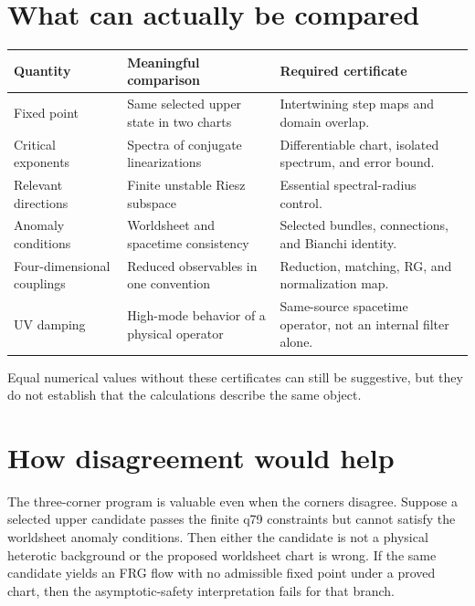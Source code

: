 \documentclass[11pt]{article}
\begin{document}
\section{What can actually be compared}

\begin{center}
\begin{tabularx}{\textwidth}{@{}
>{\raggedright\arraybackslash}p{}
>{\raggedright\arraybackslash}p{}
>{\raggedright\arraybackslash}X@{}}
\toprule
Quantity & Meaningful comparison & Required certificate\\
\midrule
Fixed point & Same selected upper state in two charts &
Intertwining step maps and domain overlap.\\
Critical exponents & Spectra of conjugate linearizations &
Differentiable chart, isolated spectrum, and error bound.\\
Relevant directions & Finite unstable Riesz subspace &
Essential spectral-radius control.\\
Anomaly conditions & Worldsheet and spacetime consistency &
Selected bundles, connections, and Bianchi identity.\\
Four-dimensional couplings & Reduced observables in one convention &
Reduction, matching, RG, and normalization map.\\
UV damping & High-mode behavior of a physical operator &
Same-source spacetime operator, not an internal filter alone.\\
\bottomrule
\end{tabularx}
\end{center}

Equal numerical values without these certificates can still be suggestive,
but they do not establish that the calculations describe the same object.

\section{How disagreement would help}

The three-corner program is valuable even when the corners disagree.
Suppose a selected upper candidate passes the finite q79 constraints but
cannot satisfy the worldsheet anomaly conditions. Then either the candidate
is not a physical heterotic background or the proposed worldsheet chart is
wrong. If the same candidate yields an FRG flow with no admissible fixed
point under a proved chart, then the asymptotic-safety interpretation fails
for that branch.
\end{document}
